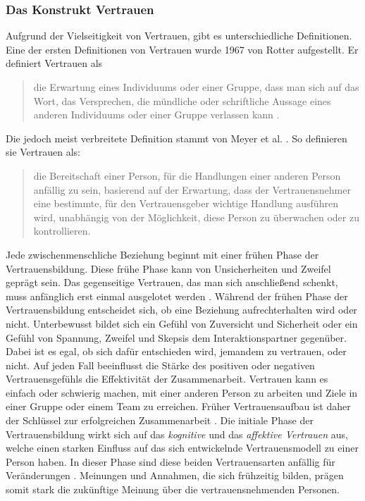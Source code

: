 \documentclass[a4paper,11pt]{article}%
\renewcommand{\\}{\vspace*{0.5\baselineskip} \newline}
\begin{document}
\subsubsection{Das Konstrukt Vertrauen}
\label{Konstrukt des Vertrauens}
Aufgrund der Vielseitigkeit von Vertrauen, gibt es unterschiedliche Definitionen. \newline
Eine der ersten Definitionen von Vertrauen wurde 1967 von Rotter aufgestellt. Er definiert Vertrauen als 
\begin{quote}
\glqq{}die Erwartung eines Individuums oder einer Gruppe, dass man sich auf das Wort, das Versprechen, die mündliche oder schriftliche Aussage eines anderen Individuums oder einer Gruppe verlassen kann\dq{} \citep[S. 651]{rotter1967new}.
\end{quote}
Die jedoch meist verbreitete Definition stammt von Meyer et al. \citep[S. 712]{mayer1995integrative}. So definieren sie Vertrauen als:
\begin{quote} \glqq{}die Bereitschaft einer Person, für die Handlungen einer anderen Person anfällig zu sein, basierend auf der Erwartung, dass der Vertrauensnehmer eine bestimmte, für den Vertrauensgeber wichtige Handlung ausführen wird, unabhängig von der Möglichkeit, diese Person zu überwachen oder zu kontrollieren.\dq{} \end{quote}
Jede zwischenmenschliche Beziehung beginnt mit einer frühen Phase der Vertrauensbildung. Diese frühe Phase kann von Unsicherheiten und Zweifel geprägt sein. Das gegenseitige Vertrauen, das man sich anschließend schenkt, muss anfänglich erst einmal ausgelotet werden \citep[S.166-168]{meyerson1996swift}.
Während der frühen Phase der Vertrauensbildung entscheidet sich, ob eine Beziehung aufrechterhalten wird oder nicht. Unterbewusst bildet sich ein Gefühl von Zuversicht und Sicherheit oder ein Gefühl von Spannung, Zweifel und Skepsis dem Interaktionspartner gegenüber. 
Dabei ist es egal, ob sich dafür entschieden wird, jemandem zu vertrauen, oder nicht. Auf jeden Fall beeinflusst die Stärke des positiven oder negativen Vertrauensgefühls die Effektivität der Zusammenarbeit. Vertrauen kann es einfach oder schwierig machen, mit einer anderen Person zu arbeiten und Ziele in einer Gruppe oder einem Team zu erreichen.
Früher Vertrauensaufbau ist daher der Schlüssel zur erfolgreichen Zusammenarbeit \citep[S. 405-406]{bigley1998straining}.
Die initiale Phase der Vertrauensbildung wirkt sich auf das \textit{kognitive} und das \textit{affektive Vertrauen} aus, welche einen starken Einfluss auf das sich entwickelnde Vertrauensmodell zu einer Person haben. In dieser Phase sind diese beiden Vertrauensarten anfällig für Veränderungen \citep[S. 461-462]{baldwin1992relational}.
Meinungen und Annahmen, die sich frühzeitig bilden, prägen somit stark die zukünftige Meinung über die vertrauensnehmenden Personen.
\end{document}

